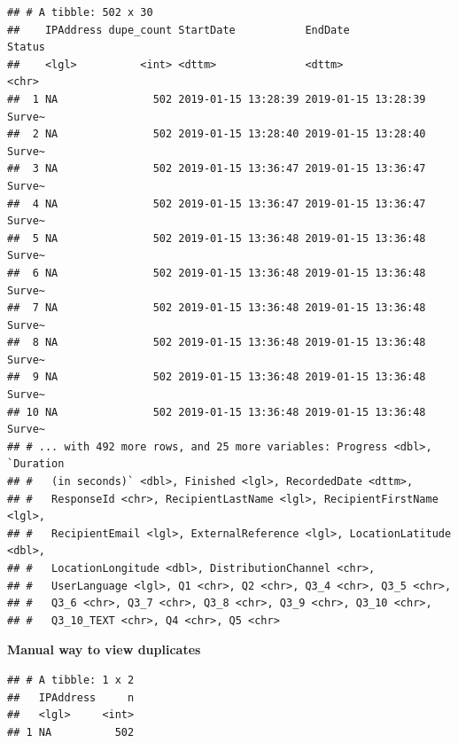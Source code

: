 \documentclass[]{book}
\newenvironment{Shaded}{\begin{snugshade}}{\end{snugshade}}
\newcommand{\CommentTok}[1]{\textcolor[rgb]{0.56,0.35,0.01}{\textit{#1}}}
\newcommand{\DecValTok}[1]{\textcolor[rgb]{0.00,0.00,0.81}{#1}}
\newcommand{\KeywordTok}[1]{\textcolor[rgb]{0.13,0.29,0.53}{\textbf{#1}}}
\newcommand{\NormalTok}[1]{#1}
\newcommand{\OperatorTok}[1]{\textcolor[rgb]{0.81,0.36,0.00}{\textbf{#1}}}
\newcommand{\StringTok}[1]{\textcolor[rgb]{0.31,0.60,0.02}{#1}}
\begin{document}
\begin{verbatim}
## # A tibble: 502 x 30
##    IPAddress dupe_count StartDate           EndDate             Status
##    <lgl>          <int> <dttm>              <dttm>              <chr> 
##  1 NA               502 2019-01-15 13:28:39 2019-01-15 13:28:39 Surve~
##  2 NA               502 2019-01-15 13:28:40 2019-01-15 13:28:40 Surve~
##  3 NA               502 2019-01-15 13:36:47 2019-01-15 13:36:47 Surve~
##  4 NA               502 2019-01-15 13:36:47 2019-01-15 13:36:47 Surve~
##  5 NA               502 2019-01-15 13:36:48 2019-01-15 13:36:48 Surve~
##  6 NA               502 2019-01-15 13:36:48 2019-01-15 13:36:48 Surve~
##  7 NA               502 2019-01-15 13:36:48 2019-01-15 13:36:48 Surve~
##  8 NA               502 2019-01-15 13:36:48 2019-01-15 13:36:48 Surve~
##  9 NA               502 2019-01-15 13:36:48 2019-01-15 13:36:48 Surve~
## 10 NA               502 2019-01-15 13:36:48 2019-01-15 13:36:48 Surve~
## # ... with 492 more rows, and 25 more variables: Progress <dbl>, `Duration
## #   (in seconds)` <dbl>, Finished <lgl>, RecordedDate <dttm>,
## #   ResponseId <chr>, RecipientLastName <lgl>, RecipientFirstName <lgl>,
## #   RecipientEmail <lgl>, ExternalReference <lgl>, LocationLatitude <dbl>,
## #   LocationLongitude <dbl>, DistributionChannel <chr>,
## #   UserLanguage <lgl>, Q1 <chr>, Q2 <chr>, Q3_4 <chr>, Q3_5 <chr>,
## #   Q3_6 <chr>, Q3_7 <chr>, Q3_8 <chr>, Q3_9 <chr>, Q3_10 <chr>,
## #   Q3_10_TEXT <chr>, Q4 <chr>, Q5 <chr>
\end{verbatim}

\textbf{Manual way to view duplicates}

\begin{Shaded}
\end{Shaded}

\begin{verbatim}
## # A tibble: 1 x 2
##   IPAddress     n
##   <lgl>     <int>
## 1 NA          502
\end{verbatim}
\end{document}
